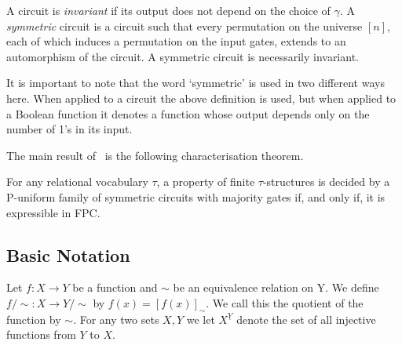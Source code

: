 \documentclass[../paper.tex]{subfiles}
\begin{document}
A circuit is \emph{invariant} if its output does not depend on the choice of
$\gamma$. A \emph{symmetric} circuit is a circuit such that every permutation on
the universe $[n]$, each of which induces a permutation on the input gates,
extends to an automorphism of the circuit. A symmetric circuit is necessarily
invariant.

It is important to note that the word `symmetric' is used in two different ways
here. When applied to a circuit the above definition is used, but when applied
to a Boolean function it denotes a function whose output depends only on the
number of 1's in its input.

The main result of~\cite{AndersonD17} is the following characterisation theorem.

\begin{thm}
  For any relational vocabulary $\tau$, a property of finite $\tau$-structures
  is decided by a P-uniform family of symmetric circuits with majority gates if,
  and only if, it is expressible in FPC.
\end{thm}

\subsection{Basic Notation}

Let $f : X \rightarrow Y$ be a function and $\sim$ be an equivalence relation on Y. We define $f/{\sim} : X \rightarrow Y/{\sim}$ by $f(x) = [f(x)]_{\sim}$. We call this the quotient of the function by $\sim$. For any two sets $X, Y$ we let $X^{\underline{Y}}$ denote the set of all injective functions from $Y$ to $X$.
\end{document}

